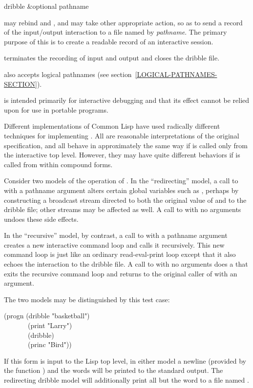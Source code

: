 \begin{defun}[Function]
dribble &optional pathname

 may rebind 
and , and may take other appropriate
action, so as to send a record of the
input/output interaction to a file named by \emph{pathname}.
The primary purpose of this is to create a readable record of an interactive
session.

 terminates the recording of input and output and
closes the dribble file.

 also accepts logical pathnames (see
section~\ref{LOGICAL-PATHNAMES-SECTION}).

 is intended primarily
for interactive debugging and that its effect cannot be
relied upon for use in portable
programs.

Different implementations of Common Lisp have used radically different
techniques for implementing .  All are reasonable interpretations
of the original specification, and all behave in approximately the same
way if  is called only from the interactive top level.
However, they may have quite different behaviors if  is
called from within compound forms.

Consider two models of the operation of .  In the ``redirecting''
model, a call to  with a pathname argument
alters certain global variables such as ,
perhaps by constructing a broadcast stream directed to both the original
value of  and to the dribble file; other streams
may be affected as well.  A call to  with no arguments
undoes these side effects.

In the ``recursive'' model, by contrast, a call to  with a
pathname argument creates a new interactive command loop and calls it
recursively.  This new command loop is just like an ordinary
read-eval-print loop except that it also echoes the interaction to
the dribble file.  A call to  with no arguments
does a  that exits the recursive command loop and returns
to the original caller of  with an argument.

The two models may be distinguished by this test case:
\begin{lisp}
(progn (dribble "basketball") \\
~~~~~~~(print "Larry") \\
~~~~~~~(dribble) \\
~~~~~~~(princ "Bird"))
\end{lisp}
If this form is input to the Lisp top level, in either model
a newline (provided by the function ) and the words
 will be printed to the standard output.
The redirecting dribble model will additionally print all but the word
 to a file named .


\end{defun}
